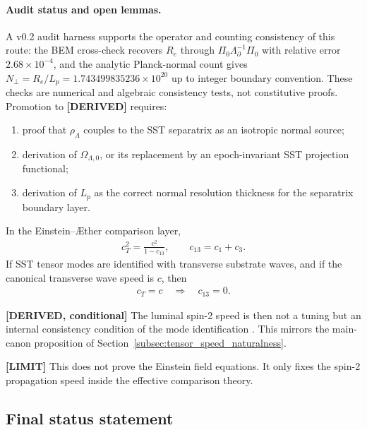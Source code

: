 \paragraph{Audit status and open lemmas.}
A v0.2 audit harness supports the operator and counting consistency of
this route: the BEM cross-check recovers \(R_e\) through
\(\Pi_0\Lambda_\partial^{-1}\Pi_0\) with relative error
\(2.68\times10^{-4}\), and the analytic Planck-normal count gives
\(N_\perp=R_e/L_p=1.743499835236\times10^{20}\) up to integer
boundary convention.  These checks are numerical and algebraic consistency
tests, not constitutive proofs.  Promotion to \textbf{[DERIVED]} requires:
\begin{enumerate}
    \item proof that \(\rho_\Lambda\) couples to the SST separatrix as an
    isotropic normal source;
    \item derivation of \(\Omega_{\Lambda,0}\), or its replacement by an
    epoch-invariant SST projection functional;
    \item derivation of \(L_p\) as the correct normal resolution thickness
    for the separatrix boundary layer.
\end{enumerate}



In the Einstein--\AE ther comparison layer,
\begin{align}
    c_T^2
    =
    \frac{c^2}{1-c_{13}},
    \qquad
    c_{13}=c_1+c_3 .
\end{align}
If SST tensor modes are identified with transverse substrate waves, and if the
canonical transverse wave speed is \(c\), then
\begin{align}
    c_T=c
    \quad\Rightarrow\quad
    c_{13}=0 .
\end{align}

\textbf{[DERIVED, conditional]} The luminal spin-2 speed is then not a tuning
but an internal consistency condition of the mode identification
\cite{FosterJacobson2006,Abbott2017GW170817}. This mirrors the main-canon
proposition of Section~\ref{subsec:tensor_speed_naturalness}.

\textbf{[LIMIT]} This does not prove the Einstein field equations. It only
fixes the spin-2 propagation speed inside the effective comparison theory.

\subsection{Final status statement}

